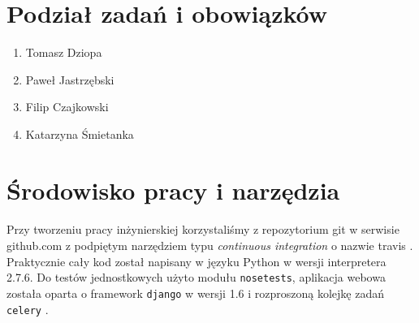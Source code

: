 \section{Podział zadań i obowiązków}
\begin{enumerate}
\item Tomasz Dziopa
\item Paweł Jastrzębski
\item Filip Czajkowski
\item Katarzyna Śmietanka
\end{enumerate}
\section{Środowisko pracy i narzędzia}
\paragraph{} Przy tworzeniu pracy inżynierskiej korzystaliśmy z repozytorium git w serwisie github.com \cite{github} z podpiętym narzędziem typu \textit{continuous integration} o nazwie travis \cite{travis}. Praktycznie cały kod został napisany w języku Python w wersji interpretera 2.7.6. Do testów jednostkowych użyto modułu \verb#nosetests#, aplikacja webowa została oparta o framework \verb#django# w wersji 1.6 i rozproszoną kolejkę zadań \verb#celery# \cite{celery}.
\paragraph{} 